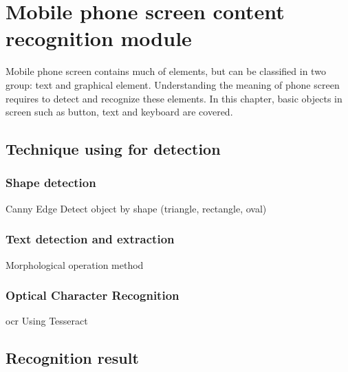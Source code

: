 \chapter{Mobile phone screen content recognition module}
Mobile phone screen contains much of elements, but can be classified in two group: text and graphical element.
Understanding the meaning of phone screen requires to detect and recognize these elements.
In this chapter, basic objects in screen such as button, text and keyboard are covered.

\section{Technique using for detection}
\subsection{Shape detection}
Canny Edge
Detect object by shape (triangle, rectangle, oval)

\subsection{Text detection and extraction}
Morphological operation method

\subsection{Optical Character Recognition}
\gls{ocr}
Using Tesseract

\section{Recognition result}
